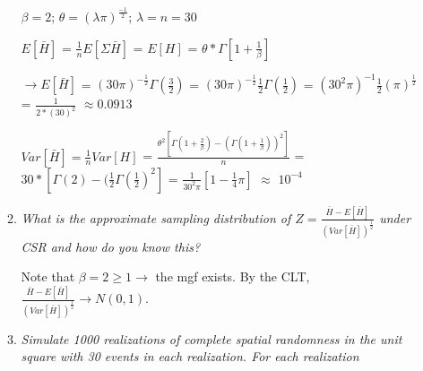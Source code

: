 \documentclass{article}\usepackage[]{graphicx}\usepackage[]{color}
\makeatletter
\newcommand{\hlnum}[1]{\textcolor[rgb]{0.686,0.059,0.569}{#1}}%
\newcommand{\hlopt}[1]{\textcolor[rgb]{0,0,0}{#1}}%
\newcommand{\hlstd}[1]{\textcolor[rgb]{0.345,0.345,0.345}{#1}}%
\newcommand{\hlkwa}[1]{\textcolor[rgb]{0.161,0.373,0.58}{\textbf{#1}}}%
\newcommand{\hlkwb}[1]{\textcolor[rgb]{0.69,0.353,0.396}{#1}}%
\newcommand{\hlkwc}[1]{\textcolor[rgb]{0.333,0.667,0.333}{#1}}%
\newcommand{\hlkwd}[1]{\textcolor[rgb]{0.737,0.353,0.396}{\textbf{#1}}}%
\newenvironment{kframe}{%
 \def\at@end@of@kframe{}%
 \ifinner\ifhmode%
  \def\at@end@of@kframe{\end{minipage}}%
  \begin{minipage}{\columnwidth}%
 \fi\fi%
 \def\FrameCommand##1{\hskip\@totalleftmargin \hskip-\fboxsep
 \colorbox{shadecolor}{##1}\hskip-\fboxsep
     \hskip-\linewidth \hskip-\@totalleftmargin \hskip\columnwidth}%
 \MakeFramed {\advance\hsize-\width
   \@totalleftmargin\z@ \linewidth\hsize
   \@setminipage}}%
 {\par\unskip\endMakeFramed%
 \at@end@of@kframe}
\newenvironment{knitrout}{}{} %
\makeatother
\begin{document}
\begin{enumerate}
\begin{enumerate}
$\beta = 2$; $\theta = (\lambda\pi)^{\frac{-1}{2}}$; $\lambda = n = 30$

$E[\bar{H}]$ = $\frac{1}{n}E[\Sigma{\bar{H}}]$ = $E[H]$ = $\theta * \Gamma[1 + \frac{1}{\beta}]$

$\rightarrow E[\bar{H}]$ = $(30\pi)^{-\frac{1}{2}}\Gamma(\frac{3}{2})$ = $(30\pi)^{-\frac{1}{2}}\frac{1}{2}\Gamma(\frac{1}{2})$ = $(30^{2}\pi)^{-1}\frac{1}{2}(\pi)^{\frac{1}{2}}$ = $\frac{1}{2*(30)^{2}}$ $\approx 0.0913$

$Var[\bar{H}] = \frac{1}{n}Var[H]$ = $\frac{\theta^{2}[\Gamma(1+\frac{2}{\beta}) - (\Gamma(1+\frac{1}{\beta}))^{2}]}{n}$ = $30*[\Gamma(2) - (\frac{1}{2}\Gamma(\frac{1}{2})^{2}]$ = $\frac{1}{30^{2}\pi}[1-\frac{1}{4}\pi]$ $\approx$ $\ensuremath{10^{-4}}$

\item %
{\it What is the approximate sampling distribution of $Z = \frac{\bar{H} - E[\bar{H}]}{(Var[\bar{H}])^{\frac{1}{2}}}$ under CSR and how do you know this?} 

Note that $\beta = 2 \geq 1 \rightarrow$ the mgf exists. By the CLT, $\frac{\bar{H} - E[\bar{H}]}{(Var[\bar{H}])^{\frac{1}{2}}} \rightarrow N(0,1)$.

\item %
{\it Simulate 1000 realizations of complete spatial randomness in the unit square with 30 events in each realization. For each realization}

\end{enumerate}
\end{enumerate}
\end{document}
